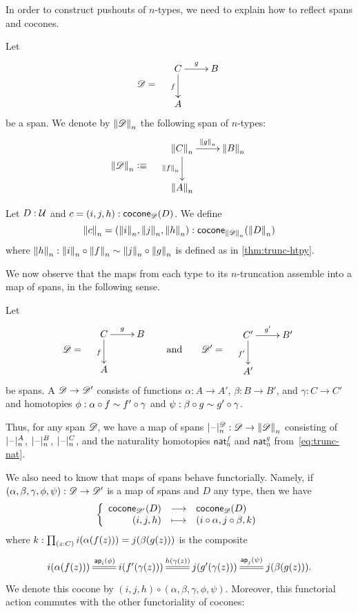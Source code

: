 In order to construct pushouts of $n$-types, we need to explain how to reflect spans and cocones.

\bgroup
\def\reflect(#1){\trunc n{#1}}

\begin{defn}
  Let
  \[\Ddiag=\quad\vcenter{\xymatrix{C \ar^g[r] \ar_f[d] & B \\ A & }}\]
  be a span. We denote by $\reflect(\Ddiag)$ the following
  span of $n$-types:
  \[\reflect(\Ddiag)\defeq\quad \vcenter{\xymatrix{\reflect(C) \ar^{\reflect(g)}[r]
      \ar_{\reflect(f)}[d] & \reflect(B) \\ \reflect(A) & }}\]
\end{defn}

\begin{defn}
  Let $D:\type$ and $c=(i,j,h):\cocone{\Ddiag}{D}$.
  We define
  \[\reflect(c)=(\reflect(i),\reflect(j),\reflect(h)):
  \cocone{\reflect(\Ddiag)}{\reflect(D)}\]
  where $\reflect(h): \reflect(i) \circ \reflect(f) \htpy \reflect(j) \circ \reflect(g)$ is defined as in \autoref{thm:trunc-htpy}.
\end{defn}

\egroup

We now observe that the maps from each type to its $n$-truncation assemble into a map of spans, in the following sense.

\begin{defn}
  Let 
  \[\Ddiag=\quad\vcenter{\xymatrix{C \ar^g[r] \ar_f[d] & B \\ A & }}
  \qquad\text{and}\qquad
  \Ddiag'=\quad\vcenter{\xymatrix{C' \ar^{g'}[r] \ar_{f'}[d] & B' \\ A' & }}
  \]
  be spans.
  A 
  $\Ddiag \to \Ddiag'$ consists of functions $\alpha:A\to A'$, $\beta:B\to B'$, and $\gamma:C\to C'$ and homotopies $\phi: \alpha\circ f \htpy f'\circ \gamma$ and $\psi:\beta\circ g \htpy g' \circ \gamma$.
\end{defn}

Thus, for any span $\Ddiag$, we have a map of spans $\tprojf[\Ddiag] n : \Ddiag \to \trunc n\Ddiag$ consisting of $\tprojf[A]n$, $\tprojf[B]n$, $\tprojf[C]n$, and the naturality homotopies $\mathsf{nat}^f_n$ and $\mathsf{nat}^g_n$ from~\eqref{eq:trunc-nat}.

We also need to know that maps of spans behave functorially.
Namely, if $(\alpha,\beta,\gamma,\phi,\psi):\Ddiag \to \Ddiag'$ is a map of spans and $D$ any type, then we have
\[ \function{\cocone{\Ddiag'}{D}}{\cocone{\Ddiag}{D}}{(i,j,h)}{(i\circ \alpha,j\circ\beta, k)} \]
where $k: \prd{z:C} i(\alpha(f(z))) = j(\beta(g(z)))$ is the composite
\begin{equation}\label{eq:mapofspans-htpy}
\xymatrix{
  i(\alpha(f(z))) \ar@{=}[r]^{\apfunc{i}(\phi)} &
  i(f'(\gamma(z))) \ar@{=}[r]^{h(\gamma(z))} &
  j(g'(\gamma(z))) \ar@{=}[r]^{\apfunc{j}(\psi)} &
  j(\beta(g(z))). }
\end{equation}
We denote this cocone by $(i,j,h) \circ (\alpha,\beta,\gamma,\phi,\psi)$.
Moreover, this functorial action commutes with the other functoriality of cocones:

